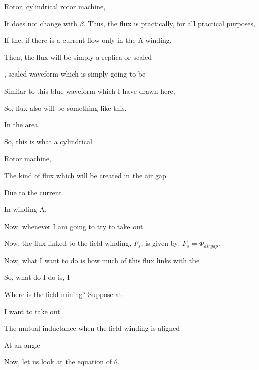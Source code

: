 \documentclass{article}
\begin{document}
Rotor, cylindrical rotor machine,

It does not change with $\beta$. Thus, the flux is practically, for all practical purposes,



If the, if there is a current flow only in the A winding,

Then, the flux will be simply a replica or scaled

, scaled waveform which is simply going to be

Similar to this blue waveform which I have drawn here,

So, flux also will be something like this.







In the area.

So, this is what a cylindrical

Rotor machine,

The kind of flux which will be created in the air gap

Due to the current

In winding A,

Now, whenever I am going to try to take out

Now, the flux linked to the field winding, $F_s$, is given by: $F_s = \Phi_{airgap}$.

Now, what I want to do is how much of this flux links with the

So, what do I do is, I



Where is the field mining? Suppose at

I want to take out

The mutual inductance when the field winding is aligned

At an angle

Now, let us look at the equation of $\theta$.



\end{document}
